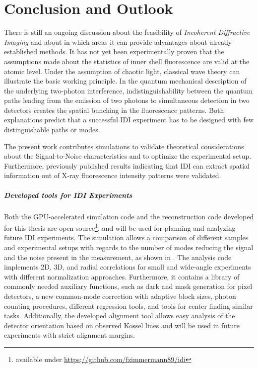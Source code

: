 \chapter{Conclusion and Outlook}
There is still an ongoing discussion about the feasibility of \textit{Incoherent Diffractive Imaging} and about in which areas it can provide advantages about already established methods. It has not yet been experimentally proven that the assumptions made about the statistics of inner shell fluorescence are valid at the atomic level. Under the assumption of chaotic light, classical wave theory can illustrate the basic working principle.  In the quantum mechanical description of the underlying two-photon interference, indistinguishability between the quantum paths leading from the emission of two photons to simultaneous detection in two detectors creates the spatial bunching in the fluorescence patterns. Both explanations predict that a successful IDI experiment has to be designed with few distinguishable paths or modes.

The present work contributes simulations to validate theoretical considerations about the Signal-to-Noise characteristics and to optimize the experimental setup. Furthermore, previously published results indicating that IDI can extract spatial information out of X-ray fluorescence intensity patterns were validated.

\paragraph{Developed tools for IDI Experiments}
Both the GPU-accelerated simulation code and the reconstruction code developed for this thesis are open source\footnote{available under \url{https;//github.com/fzimmermann89/idi}}, and will be used for planning and analyzing future IDI experiments. The simulation allows a comparison of different samples and experimental setups with regards to the number of modes reducing the signal and the noise present in the measurement, as shown in .
The analysis code implements 2D, 3D, and radial correlations for small and wide-angle experiments with different normalization approaches. Furthermore, it contains a library of commonly needed auxiliary functions, such as dark and mask generation for pixel detectors, a new common-mode correction with adaptive block sizes, photon counting procedures, different regression tools, and tools for center finding similar tasks.
Additionally, the developed alignment tool allows easy analysis of the detector orientation based on observed Kossel lines and will be used in future experiments with strict alignment margins.

